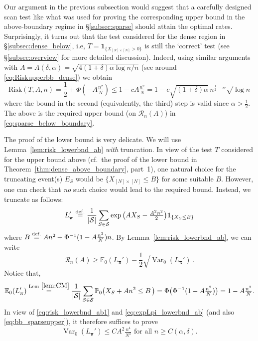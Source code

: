 \documentclass[11pt,reqno,letterpaper]{amsart}
\numberwithin{equation}{section}
\theoremstyle{plain}
\def \bpi{\boldsymbol{\pi}}
\def \E{\mathbb{E}}
\def \P{\mathbb{P}}
\providecommand{\var}{\operatorname{Var}}
\begin{document}
\smallskip

 Our argument in the previous subsection 
would suggest that a carefully designed scan test like what was used for proving 
the corresponding upper bound in the above-boundary regime in \S\ref{subsec:sparse} should attain the optimal rates. Surprisingly, it turns out that the test considered for the dense region in \S\ref{subsec:dense_below}, i.e, $T {=} 
\mathbf 1_{\{ X_{[N] \times [N]} > 0\}}$ is still the `correct' test (see 
\S\ref{subsec:overview} for more detailed discussion). Indeed, using similar 
arguments with $A = A(\delta, \alpha) = \sqrt{4(1+\delta)\alpha\log n / n}$ (see around \eqref{eq:Riskupperbb_dense}) we obtain
\begin{equation}\label{eq:bb_sparseupper}
\mathrm{Risk}(T,A,n) = \frac 12 + \Phi(-A\tfrac{n^2}N) \le 1 - c A\tfrac{n^2}N = 1 - c \sqrt{(1 + \delta)\alpha} \, n^{\frac12 - \alpha}\sqrt{\log n}\end{equation}
where the bound in the second (equivalently, the third) step is valid since 
$\alpha > \frac 12$. The above is the required upper bound (on $\mathcal R_n(A)$) in \eqref{eq:sparse_below_boundary}.

\smallskip

 The proof of the lower bound is very delicate. We will use Lemma~\ref{lem:risk_lowerbnd_ab} {\em 
with} truncation. In view of the test $T$ considered for the upper bound above (cf.~the proof of the lower bound in 
Theorem~\ref{thm:dense_above_boundary}, part~1), one natural choice for the truncating event(s) $E_S$ would be $\{X_{[N]\times[N]} \le 
B\}$ for some suitable $B$. However, one can check that {\em no} such choice would lead to the required bound. Instead, we truncate as 
follows:
\begin{equation}\label{def:Lpi'}
L_{\bpi}' \stackrel{{\rm def.}}{=} \frac{1}{|\mathcal S|} \sum_{S \in \mathcal S} \exp\big(A X_S - \tfrac{A^2n^2}{2}\big) \mathbf{1}_{\{X_{S} \le B\}}
\end{equation}
where $B \stackrel{{\rm def.}}{=}An^2 + \Phi^{-1}(1 - A\tfrac{n^2}{N})n$. By Lemma~\ref{lem:risk_lowerbnd_ab}, we can write
\begin{equation}\label{eq:risk_lowerbnd_ab1}
\mathcal R_n(A) \ge \E_0(L_{\bpi}') - \frac12\sqrt{\var_0(L_{\bpi}')}\,.
\end{equation}
Notice that,
\begin{equation}\label{eq:expLpi_lowerbnd_ab}
\E_0(L_{\bpi}') \stackrel{{\rm Lem}~\ref{lem:CM}}{=} \frac 1{|\mathcal S|} \sum_{S \in \mathcal S}
\P_{0}\big ( X_{S} + An^2  \le B\, \big) = \Phi\big(\Phi^{-1}(1 - A\tfrac{n^2}{N})\big) =  1 - A\tfrac{n^2}{N}.
\end{equation}
In view of %
\eqref{eq:risk_lowerbnd_ab1} and \eqref{eq:expLpi_lowerbnd_ab} (and also \eqref{eq:bb_sparseupper}), it therefore suffices to prove
\begin{equation}\label{eq:second_mom_ab}
\var_0(L_{\bpi}') \le C A^2\tfrac{n^4}{N^2} \mbox{ for all $n \ge C(\alpha, \delta)$.}
\end{equation}
\end{document}
